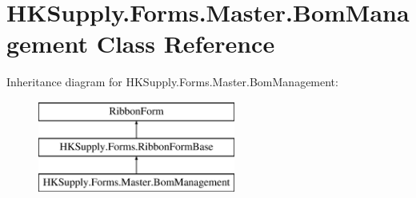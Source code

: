 \hypertarget{class_h_k_supply_1_1_forms_1_1_master_1_1_bom_management}{}\section{H\+K\+Supply.\+Forms.\+Master.\+Bom\+Management Class Reference}
\label{class_h_k_supply_1_1_forms_1_1_master_1_1_bom_management}
Inheritance diagram for H\+K\+Supply.\+Forms.\+Master.\+Bom\+Management\+:\begin{figure}[H]
\begin{center}
\leavevmode
\includegraphics[height=3.000000cm]{class_h_k_supply_1_1_forms_1_1_master_1_1_bom_management}
\end{center}
\end{figure}
